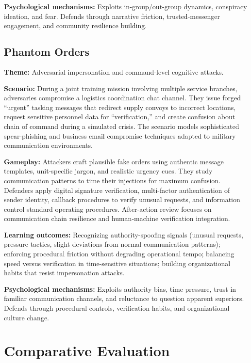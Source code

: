 \documentclass[12pt]{article}
\begin{document}
\textbf{Psychological mechanisms:} Exploits in-group/out-group dynamics, conspiracy ideation, and fear. Defends through narrative friction, trusted-messenger engagement, and community resilience building.

\subsection{Phantom Orders}

\textbf{Theme:} Adversarial impersonation and command-level cognitive attacks.

\textbf{Scenario:} During a joint training mission involving multiple service branches, adversaries compromise a logistics coordination chat channel. They issue forged ``urgent'' tasking messages that redirect supply convoys to incorrect locations, request sensitive personnel data for ``verification,'' and create confusion about chain of command during a simulated crisis. The scenario models sophisticated spear-phishing and business email compromise techniques adapted to military communication environments.

\textbf{Gameplay:} Attackers craft plausible fake orders using authentic message templates, unit-specific jargon, and realistic urgency cues. They study communication patterns to time their injections for maximum confusion. Defenders apply digital signature verification, multi-factor authentication of sender identity, callback procedures to verify unusual requests, and information control standard operating procedures. After-action review focuses on communication chain resilience and human-machine verification integration.

\textbf{Learning outcomes:} Recognizing authority-spoofing signals (unusual requests, pressure tactics, slight deviations from normal communication patterns); enforcing procedural friction without degrading operational tempo; balancing speed versus verification in time-sensitive situations; building organizational habits that resist impersonation attacks.

\textbf{Psychological mechanisms:} Exploits authority bias, time pressure, trust in familiar communication channels, and reluctance to question apparent superiors. Defends through procedural controls, verification habits, and organizational culture change.

\section{Comparative Evaluation}
\end{document}
